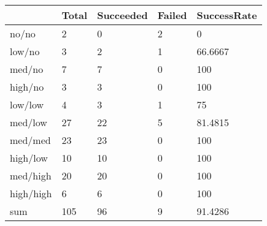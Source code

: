 \begin{tabular}{lllll}
& Total & Succeeded & Failed & SuccessRate \\ 
\hline 
no/no & 2 & 0 & 2 & 0 \\ 
low/no & 3 & 2 & 1 & 66.6667 \\ 
med/no & 7 & 7 & 0 & 100 \\ 
high/no & 3 & 3 & 0 & 100 \\ 
low/low & 4 & 3 & 1 & 75 \\ 
med/low & 27 & 22 & 5 & 81.4815 \\ 
med/med & 23 & 23 & 0 & 100 \\ 
high/low & 10 & 10 & 0 & 100 \\ 
med/high & 20 & 20 & 0 & 100 \\ 
high/high & 6 & 6 & 0 & 100 \\ 
sum & 105 & 96 & 9 & 91.4286 \\ 
\hline 
\end{tabular}